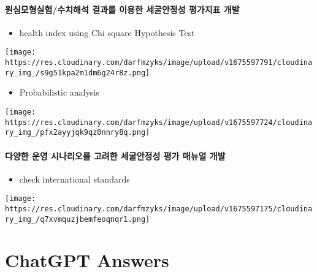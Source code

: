 \documentclass[
  letterpaper,
  DIV=11,
  numbers=noendperiod]{scrreprt}
\providecommand{\tightlist}{%
  \setlength{\itemsep}{0pt}\setlength{\parskip}{0pt}}\usepackage{longtable,booktabs,array}
\begin{document}
\hypertarget{uxc6d0uxc2ecuxbaa8uxd615uxc2e4uxd5d8uxc218uxce58uxd574uxc11d-uxacb0uxacfcuxb97c-uxc774uxc6a9uxd55c-uxc138uxad74uxc548uxc815uxc131-uxd3c9uxac00uxc9c0uxd45c-uxac1cuxbc1c}{%
\subsubsection{원심모형실험/수치해석 결과를 이용한 세굴안정성 평가지표
개발}\label{uxc6d0uxc2ecuxbaa8uxd615uxc2e4uxd5d8uxc218uxce58uxd574uxc11d-uxacb0uxacfcuxb97c-uxc774uxc6a9uxd55c-uxc138uxad74uxc548uxc815uxc131-uxd3c9uxac00uxc9c0uxd45c-uxac1cuxbc1c}}

\begin{itemize}
\tightlist
\item
  health index using Chi square Hypothesis Test
\end{itemize}

\texttt{[image: https://res.cloudinary.com/darfmzyks/image/upload/v1675597791/cloudinary\_img\_/s9g51kpa2m1dm6g24r8z.png]}

\begin{itemize}
\tightlist
\item
  Probabilistic analysis
\end{itemize}

\texttt{[image: https://res.cloudinary.com/darfmzyks/image/upload/v1675597724/cloudinary\_img\_/pfx2ayyjqk9qz0nnry8q.png]}

\hypertarget{uxb2e4uxc591uxd55c-uxc6b4uxc601-uxc2dcuxb098uxb9acuxc624uxb97c-uxace0uxb824uxd55c-uxc138uxad74uxc548uxc815uxc131-uxd3c9uxac00-uxb9e4uxb274uxc5bc-uxac1cuxbc1c}{%
\subsubsection{다양한 운영 시나리오를 고려한 세굴안정성 평가 매뉴얼
개발}\label{uxb2e4uxc591uxd55c-uxc6b4uxc601-uxc2dcuxb098uxb9acuxc624uxb97c-uxace0uxb824uxd55c-uxc138uxad74uxc548uxc815uxc131-uxd3c9uxac00-uxb9e4uxb274uxc5bc-uxac1cuxbc1c}}

\begin{itemize}
\tightlist
\item
  check international standards
\end{itemize}

\texttt{[image: https://res.cloudinary.com/darfmzyks/image/upload/v1675597175/cloudinary\_img\_/q7xvmquzjbemfeoqnqr1.png]}

\hypertarget{chatgpt-answers}{%
\chapter{ChatGPT Answers}\label{chatgpt-answers}}
\end{document}
